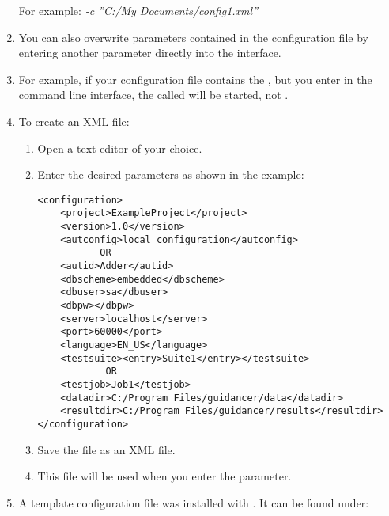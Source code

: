 \begin{enumerate}
For example:
\emph{-c ''C:/My Documents/config1.xml''}
\item You can also overwrite parameters contained in the configuration file by entering another parameter directly into the interface. 
\item For example, if your configuration file contains the \gdsuite{} , but you enter  in the command line interface, the \gdsuite{} called  will be started, not .
\item To create an XML file:
\begin{enumerate} 
\item Open a text editor of your choice. 
\item Enter the desired parameters as shown in the example:
\footnotesize
\begin{verbatim}
<configuration>
    <project>ExampleProject</project>
    <version>1.0</version>
    <autconfig>local configuration</autconfig>
           OR
    <autid>Adder</autid>
    <dbscheme>embedded</dbscheme>
    <dbuser>sa</dbuser>
    <dbpw></dbpw>
    <server>localhost</server>
    <port>60000</port>
    <language>EN_US</language>
    <testsuite><entry>Suite1</entry></testsuite>
            OR
    <testjob>Job1</testjob>        
    <datadir>C:/Program Files/guidancer/data</datadir>
    <resultdir>C:/Program Files/guidancer/results</resultdir>
</configuration>
\end{verbatim}
\normalsize
\item Save the file as an XML file.
\item This file will be used when you enter the  parameter.
\end{enumerate}
\item A template configuration file was installed with \app{}. It can be found under:\\
\end{enumerate}
